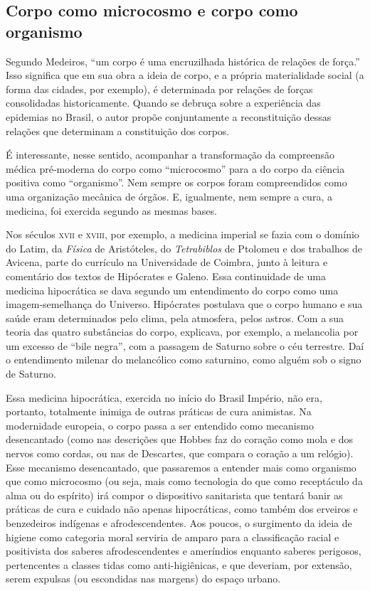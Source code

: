 \subsection*{Corpo como microcosmo e corpo como
organismo}

Segundo Medeiros, ``um corpo é uma encruzilhada histórica de relações de
força.'' Isso significa que em sua obra a ideia de corpo, e a própria
materialidade social (a forma das cidades, por exemplo), é determinada
por relações de forças consolidadas historicamente. Quando se debruça
sobre a experiência das epidemias no Brasil, o autor propõe
conjuntamente a reconstituição dessas relações que determinam a
constituição dos corpos.

É interessante, nesse sentido, acompanhar a transformação da compreensão
médica pré-moderna do corpo como ``microcosmo'' para a do corpo da
ciência positiva como ``organismo''. Nem sempre os corpos foram
compreendidos como uma organização mecânica de órgãos. E, igualmente,
nem sempre a cura, a medicina, foi exercida segundo as mesmas bases.

Nos séculos \textsc{xvii} e \textsc{xviii}, por exemplo, a medicina imperial se fazia com
o domínio do Latim, da \textit{Física} de Aristóteles, do
\textit{Tetrabiblos} de Ptolomeu e dos trabalhos de Avicena, parte do
currículo na Universidade de Coimbra, junto à leitura e comentário dos
textos de Hipócrates e Galeno. Essa continuidade de uma medicina
hipocrática se dava segundo um entendimento do corpo como uma
imagem-semelhança do Universo. Hipócrates postulava que o corpo humano e
sua saúde eram determinados pelo clima, pela atmosfera, pelos astros.
Com a sua teoria das quatro substâncias do corpo, explicava, por
exemplo, a melancolia por um excesso de ``bile negra'', com a passagem
de Saturno sobre o céu terrestre. Daí o entendimento milenar do
melancólico como saturnino, como alguém sob o signo de Saturno.

Essa medicina hipocrática, exercida no início do Brasil Império, não
era, portanto, totalmente inimiga de outras práticas de cura animistas.
Na modernidade europeia, o corpo passa a ser entendido como mecanismo
desencantado (como nas descrições que Hobbes faz do coração como mola e
dos nervos como cordas, ou nas de Descartes, que compara o coração a um
relógio). Esse mecanismo desencantado, que passaremos a entender mais
como organismo que como microcosmo (ou seja, mais como tecnologia do que
como receptáculo da alma ou do espírito) irá compor o dispositivo
sanitarista que tentará banir as práticas de cura e cuidado não apenas
hipocráticas, como também dos erveiros e benzedeiros indígenas e
afrodescendentes. Aos poucos, o surgimento da ideia de higiene como
categoria moral serviria de amparo para a classificação racial e
positivista dos saberes afrodescendentes e ameríndios enquanto saberes
perigosos, pertencentes a classes tidas como anti-higiênicas, e que
deveriam, por extensão, serem expulsas (ou escondidas nas margens) do
espaço urbano.

